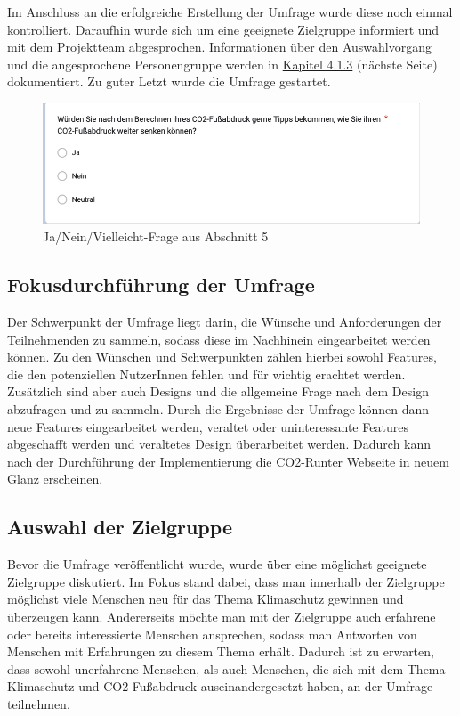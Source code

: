 Im Anschluss an die erfolgreiche Erstellung der Umfrage wurde diese noch einmal kontrolliert.
Daraufhin wurde sich um eine geeignete Zielgruppe informiert und mit dem Projektteam abgesprochen.
Informationen über den Auswahlvorgang und die angesprochene Personengruppe werden in \hyperref[subsec:auswahl-der-zielgruppe]{Kapitel 4.1.3} (nächste Seite) dokumentiert.
Zu guter Letzt wurde die Umfrage gestartet.

\begin{figure}[H]
    \centering
    \includegraphics[width=1\textwidth]{images/05/picture_of_yes_no_eventually_question}
    \caption{Ja/Nein/Vielleicht-Frage aus Abschnitt 5}
    \label{fig:picture-of-yes-no-evetually-question}
\end{figure}

\subsection{Fokusdurchführung der Umfrage}

Der Schwerpunkt der Umfrage liegt darin, die Wünsche und Anforderungen der Teilnehmenden zu sammeln, sodass diese im Nachhinein eingearbeitet werden können.
Zu den Wünschen und Schwerpunkten zählen hierbei sowohl Features, die den potenziellen NutzerInnen fehlen und für wichtig erachtet werden.
Zusätzlich sind aber auch Designs und die allgemeine Frage nach dem Design abzufragen und zu sammeln.
Durch die Ergebnisse der Umfrage können dann neue Features eingearbeitet werden, veraltet oder uninteressante Features abgeschafft werden und veraltetes Design überarbeitet werden.
Dadurch kann nach der Durchführung der Implementierung die CO2-Runter Webseite in neuem Glanz erscheinen.

\subsection{Auswahl der Zielgruppe}
\label{subsec:auswahl-der-zielgruppe}

Bevor die Umfrage veröffentlicht wurde, wurde über eine möglichst geeignete Zielgruppe diskutiert.
Im Fokus stand dabei, dass man innerhalb der Zielgruppe möglichst viele Menschen neu für das Thema Klimaschutz gewinnen und überzeugen kann.
Andererseits möchte man mit der Zielgruppe auch erfahrene oder bereits interessierte Menschen ansprechen, sodass man Antworten von Menschen mit Erfahrungen zu diesem Thema erhält.
Dadurch ist zu erwarten, dass sowohl unerfahrene Menschen, als auch Menschen, die sich mit dem Thema Klimaschutz und CO2-Fußabdruck auseinandergesetzt haben, an der Umfrage teilnehmen.


